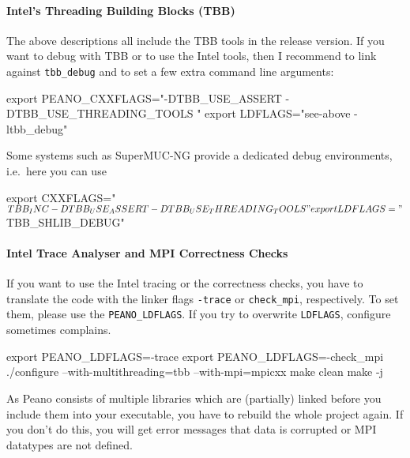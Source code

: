 \paragraph{Intel's Threading Building Blocks (TBB)}

The above descriptions all include the TBB tools in the release version.
If you want to debug with TBB or to use the Intel tools, then I recommend to
link against \texttt{tbb\_debug} and to set a few extra command line arguments:

\begin{code}
 export PEANO_CXXFLAGS="-DTBB_USE_ASSERT -DTBB_USE_THREADING_TOOLS "
 export LDFLAGS="see-above   -ltbb_debug"
\end{code}

\noindent
Some systems such as SuperMUC-NG provide a dedicated debug environments,
i.e.~here you can use
\begin{code}
 export CXXFLAGS="$TBB_INC -DTBB_USE_ASSERT -DTBB_USE_THREADING_TOOLS "
 export LDFLAGS="$TBB_SHLIB_DEBUG"
\end{code}


\paragraph{Intel Trace Analyser and MPI Correctness Checks}

If you want to use the Intel tracing or the correctness checks, you have to
translate the code with the linker flags \texttt{-trace} or \texttt{check\_mpi},
respectively.
To set them, please use the \texttt{PEANO\_LDFLAGS}.
If you try to overwrite \texttt{LDFLAGS}, configure sometimes complains.


\begin{code}
 export PEANO_LDFLAGS=-trace
 export PEANO_LDFLAGS=-check_mpi
 ./configure --with-multithreading=tbb --with-mpi=mpicxx
 make clean
 make -j
\end{code}


\noindent
As Peano consists of multiple libraries which are (partially) linked before you
include them into your executable, you have to rebuild the whole project again.
If you don't do this, you will get error messages that data is corrupted or MPI
datatypes are not defined.


% 
% 

